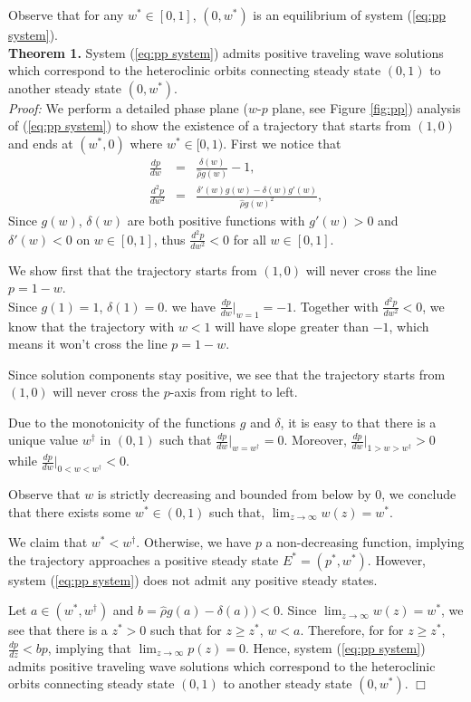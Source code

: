 \documentclass{aims}
\numberwithin{equation}{section}
\begin{document}
Observe that for any $w^*\in [0,1]$, $(0, w^*)$ is an equilibrium of system (\ref{eq:pp system}). \\

\noindent
\textbf{Theorem 1.}  System (\ref{eq:pp system}) admits positive traveling wave solutions which correspond to the heteroclinic orbits connecting steady state $(0, 1)$ to another steady state $(0, w^*)$. \\
\emph{Proof:} We perform a detailed phase plane ($w$-$p$ plane, see Figure \ref{fig:pp}) analysis of (\ref{eq:pp system})
to show the existence of a trajectory that starts from $(1,0)$ and ends at $(w^{*},0)$ where $w^*\in [0,1)$.
First we notice that 
\begin{eqnarray}
\frac{dp}{dw} & = & \frac{\delta(w)}{\hat{\rho}g(w)}-1 , \\
\frac{d^{2}p}{dw^{2}} & = & \frac{\delta'(w)g(w)-\delta(w)g'(w)}{\hat{\rho} g(w)^{2}},
\end{eqnarray}
Since $g(w)$, $\delta(w)$ are both positive functions with $g'(w)>0$ and $\delta'(w)<0$ on $w\in [0,1]$, thus $\frac{d^{2}p}{dw^{2}}<0$ for all $w\in [0,1]$. 

We show first that the trajectory starts from $(1,0)$ will never cross the line $p=1-w$. \\
Since $g(1)=1$, $\delta(1)=0$. we have $\frac{dp}{dw}\vert_{w=1}=-1$. Together with $\frac{d^{2}p}{dw^{2}}<0$, we know that the trajectory with $w<1$ will have slope greater than $-1$, which means it won't cross the line $p=1-w$.

Since solution components stay positive, we see that the trajectory starts from $(1,0)$ will never cross the $p$-axis from right to left. 

Due to the monotonicity of the functions $g$ and $\delta$, it is easy to that there is a unique value $w^{\dagger}$ in $(0, 1)$ such that 
$\frac{dp}{dw}\vert_{w=w^{\dagger}}=0.$ Moreover, $\frac{dp}{dw}\vert_{1>w>w^{\dagger}}>0$ while
$\frac{dp}{dw}\vert_{0<w<w^{\dagger}}<0.$

Observe that $w$ is strictly decreasing and bounded from below by 0, we conclude that there exists some $w^*\in(0,1)$ such that, $\lim_{z \rightarrow \infty} w(z)=w^*$. 

We claim that $w^*<w^{\dagger}.$ Otherwise, we have $p$ a non-decreasing function, implying the trajectory approaches a positive steady state $E^*=(p^*, w^*).$ However, system (\ref{eq:pp system}) does not admit any positive steady states. 

Let $a \in (w^*, w^{\dagger})$ and $b=\hat{\rho}g(a)-\delta(a)) <0.$ Since
$\lim_{z \rightarrow \infty}w(z)=w^*$, we see that there is a $z^*>0$ such that for $z \geq z^*$, $w<a$. Therefore, for for $z \geq z^*$, 
$\frac{dp}{dz}<bp$, implying that $\lim_{z \rightarrow \infty} p(z)=0.$
Hence, system (\ref{eq:pp system}) admits positive traveling wave solutions which correspond to the heteroclinic orbits connecting steady state $(0, 1)$ to another steady state $(0, w^*)$. $\Box$
\end{document}
